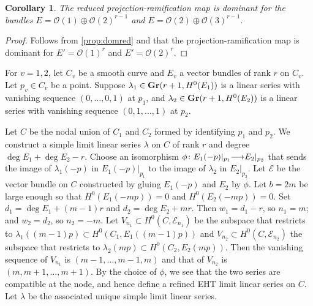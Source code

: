 \documentclass[11pt,reqno]{amsart}
\theoremstyle{plain}
\newtheorem{corollary}[theorem]{Corollary}
\theoremstyle{definition}
\theoremstyle{remark}
\numberwithin{equation}{section}
\renewcommand{\to}{{\longrightarrow}}
\numberwithin{equation}{section}
\renewcommand{\O}{\mathcal O}
\begin{document}
\begin{corollary}\label{prop:domredexamples}
  The reduced projection-ramification map is dominant for the bundles $E = \O(1) \oplus \O(2)^{r-1}$ and $E = \O(2) \oplus \O(3)^{r-1}$.
\end{corollary}
\begin{proof}
  Follows from \autoref{prop:domred} and that the projection-ramification map is dominant for $E' = \O(1)^r$ and $E' = \O(2)^r$.
\end{proof}

For $v = 1, 2$, let $C_v$ be a smooth curve and $E_v$ a vector bundles of rank $r$ on $C_v$.
Let $p_v \in C_v$ be a point.
Suppose $\lambda_1 \in {\bf Gr}(r+1, H^0(E_1))$ is a linear series with vanishing sequence $(0, \dots, 0, 1)$ at $p_1$, and $\lambda_2 \in {\bf Gr}(r+1,H^0(E_2))$ is a linear series with vanishing sequence $(0,1,\dots,1)$ at $p_2$.

Let $C$ be the nodal union of $C_1$ and $C_2$ formed by identifying $p_1$ and $p_2$.
We construct a simple limit linear series $\lambda$ on $C$ of rank $r$ and degree $\deg E_1 + \deg E_2 - r$.
Choose an isomorphism $\phi \from E_1(-p)|_{p_1} \to E_2|_{p_2}$ that sends the image of $\lambda_1(-p)$ in $E_1(-p)|_{p_1}$ to the image of $\lambda_2$ in $E_2|_{p_2}$.
Let $\mathcal E$ be the vector bundle on $C$ constructed by gluing $E_1(-p)$ and $E_2$ by $\phi$.
Let $b=2m$ be large enough so that $H^0(E_1(-mp)) = 0$ and $H^0(E_2(-mp)) = 0$.
Set $d_1 = \deg E_1 + (m-1)r$ and $d_2 = \deg E_2 + mr$.
Then $w_1 = d_1 - r$, so $n_1 = m$; and $w_2 = d_2$, so $n_2 = -m$.
Let $V_{n_1} \subset H^0(C, \mathcal E_{n_1})$ be the subspace that restricts to $\lambda_1((m-1)p) \subset H^0(C_1, E_1((m-1)p))$ and $V_{n_2} \subset H^0(C, \mathcal E_{n_2})$ the subspace that restricts to $\lambda_2(mp) \subset H^0(C_2, E_2(mp))$.
Then the vanishing sequence of $V_{n_1}$ is $(m-1,\dots,m-1,m)$ and that of $V_{n_2}$ is $(m, m+1, \dots, m+1)$.
By the choice of $\phi$, we see that the two series are compatible at the node, and hence define a refined EHT limit linear series on $C$.
Let $\lambda$ be the associated unique simple limit linear series.
\end{document}
